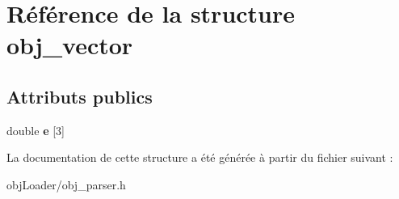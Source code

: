 \hypertarget{structobj__vector}{\section{Référence de la structure obj\-\_\-vector}
\label{structobj__vector}
}
\subsection*{Attributs publics}
\begin{DoxyCompactItemize}
\item 
\hypertarget{structobj__vector_a7a220179dc367fff3b43da470ac7b989}{double {\bfseries e} \mbox{[}3\mbox{]}}\label{structobj__vector_a7a220179dc367fff3b43da470ac7b989}

\end{DoxyCompactItemize}


La documentation de cette structure a été générée à partir du fichier suivant \-:\begin{DoxyCompactItemize}
\item 
obj\-Loader/obj\-\_\-parser.\-h\end{DoxyCompactItemize}

